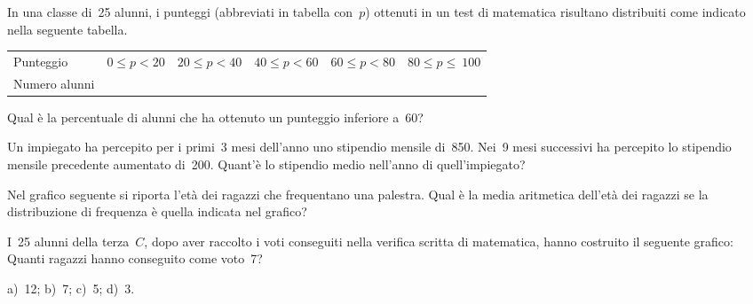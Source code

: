 \begin{esercizio}
\label{ese:A.53}
In una classe di~25 alunni, i punteggi (abbreviati in tabella con~\(p\)) 
ottenuti in un test di matematica risultano distribuiti come indicato nella 
seguente tabella.
\begin{center}
 \begin{tabular}{l*{5}{c}}
\toprule
Punteggio & \(0 \leq p < 20\) & \(20 \leq p < 40\) & \(40 \leq p < 60\) & \(60 
\leq p < 80\) & \(80 \leq p \leq~100\) \\
Numero alunni & & & & & \\
\bottomrule
\end{tabular}
\end{center}
Qual è la percentuale di alunni che ha ottenuto un punteggio inferiore a~60?
\end{esercizio}

\begin{esercizio}
\label{ese:A.54}
Un impiegato ha percepito per i primi~3 mesi dell'anno uno stipendio 
mensile di~850\officialeuro . Nei~9 mesi successivi ha percepito
lo stipendio mensile precedente aumentato di~200\officialeuro . Quant'è lo 
stipendio medio nell'anno di quell'impiegato?
\end{esercizio}

\begin{multicols}{2}
\begin{esercizio}
\label{ese:A.55}
Nel grafico seguente si riporta l'età dei ragazzi che frequentano una 
palestra. Qual è la media aritmetica dell'età dei ragazzi
se la distribuzione di frequenza è quella indicata nel grafico?
\begin{center}
 
\end{center}
\end{esercizio}
\end{multicols}

\begin{multicols}{2}
\begin{esercizio}
\label{ese:A.56}
I~25 alunni della terza~\(C\), dopo aver raccolto i voti conseguiti
nella verifica scritta di matematica, hanno costruito il seguente grafico:
Quanti ragazzi hanno conseguito come voto~7?

a)~12; \quad b)~7; \quad c)~5; \quad d)~3.
\begin{center}
 
\end{center}
\end{esercizio}
\end{multicols}

